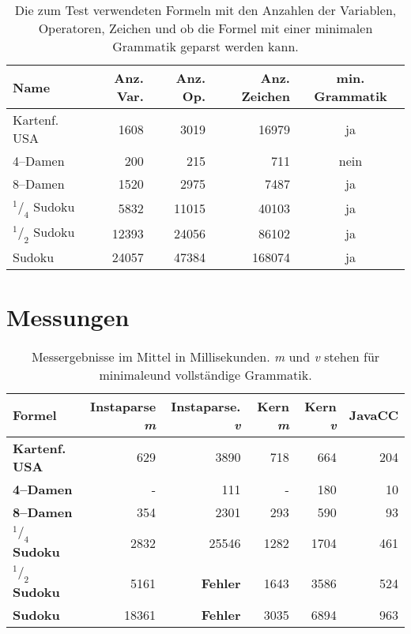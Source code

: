 \documentclass[ngerman,a4paper,abstracton,open=right,twoside=false,toc=listofnumbered,bibtotocnumbered]{scrreprt}
\begin{document}
\begin{table}[h]
	\begin{tabular}{|l|r|r|r|c|}
		\hline
		\textbf{Name} & \textbf{Anz. Var.} & \textbf{Anz. Op.} & \textbf{Anz. Zeichen} & \textbf{min. Grammatik} \\ \hline
		Kartenf. USA & 1608 & 3019 & 16979 & ja \\ \hline
		4--Damen & 200 & 215 & 711 & nein \\ \hline
		8--Damen & 1520 & 2975 & 7487 & ja \\ \hline
		$^1/_4$ Sudoku & 5832 & 11015 & 40103 & ja \\ \hline
		$^1/_2$ Sudoku & 12393 & 24056 & 86102 & ja \\ \hline
		Sudoku & 24057 & 47384 & 168074 & ja \\ \hline
	\end{tabular}
	\caption{Die zum Test verwendeten Formeln mit den Anzahlen der Variablen, Operatoren, Zeichen und ob die Formel mit einer minimalen Grammatik geparst werden kann.}
\end{table}

\section{Messungen}

\begin{table}[h]
	\begin{tabular}{|l|r|r|r|r|r|}
		\hline
		\textbf{Formel} & \textbf{Instaparse \emph{m}} & \textbf{Instaparse. \emph{v}} & \textbf{Kern \emph{m}} & \textbf{Kern \emph{v}} & \textbf{JavaCC} \\ \hline
		\textbf{Kartenf. USA} & 629 & 3890 & 718 & 664 & 204 \\ \hline
		\textbf{4--Damen} & - & 111 & - & 180 & 10 \\ \hline
		\textbf{8--Damen} & 354 & 2301 & 293 & 590 & 93 \\ \hline
		\textbf{$^1/_4$ Sudoku} & 2832 & 25546 & 1282 & 1704 & 461 \\ \hline
		\textbf{$^1/_2$ Sudoku} & 5161 & \textbf{Fehler} & 1643 & 3586 & 524 \\ \hline
		\textbf{Sudoku} & 18361 & \textbf{Fehler} & 3035 & 6894 & 963 \\ \hline 
	\end{tabular}

	\caption{Messergebnisse im Mittel in Millisekunden. \emph{m} und \emph{v} stehen für \glqq minimale\grqq und \glqq vollständige Grammatik\grqq.}
\end{table}
\end{document}
